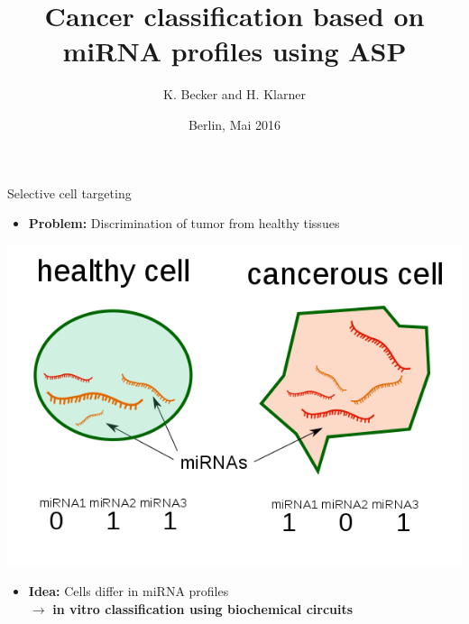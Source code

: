 \documentclass[10pt,dvipsnames]{beamer}
\title{Cancer classification based on miRNA profiles using ASP}
\author{K. Becker and H. Klarner}
\date{Berlin, Mai 2016}
\institute{
Freie Universität Berlin, Germany
}
\begin{document}
\frame{\titlepage}




\begin{frame}{Selective cell targeting}
\large
\begin{itemize}
\item \textbf{Problem:} Discrimination of tumor from healthy tissues
\end{itemize}
\vspace{0.5cm}
\begin{center}
\includegraphics[scale=0.3]{cells1.png}
\end{center}
\vspace{0.5cm}
\begin{itemize}
\item \textbf{Idea:} Cells differ in miRNA profiles\\
$\rightarrow$ \textbf{in vitro classification using biochemical circuits}
\end{itemize}
\end{frame}
\end{document}
